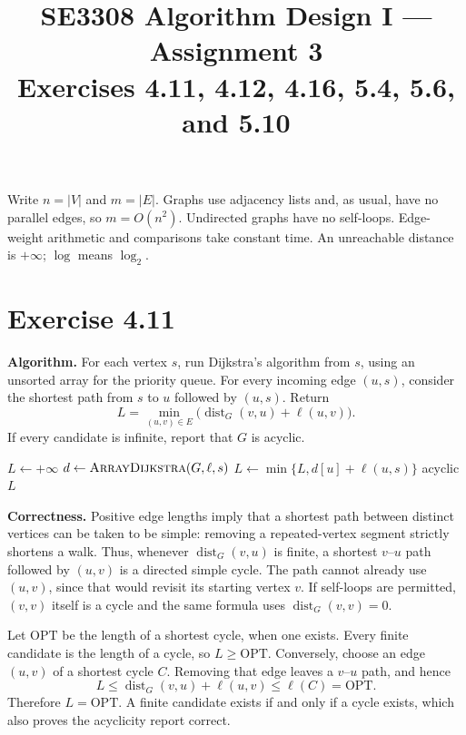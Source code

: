 \documentclass[11pt]{article}
\title{SE3308 Algorithm Design I --- Assignment 3\\[0.3em]
\large Exercises 4.11, 4.12, 4.16, 5.4, 5.6, and 5.10}
\author{\studentname\quad\studentid}
\date{}
\newcommand{\dist}{\operatorname{dist}}
\newcommand{\exercise}[1]{\Needspace{6\baselineskip}\section*{Exercise #1}}
\begin{document}
\maketitle

Write $n=|V|$ and $m=|E|$. Graphs use adjacency lists and, as usual, have no
parallel edges, so $m=O(n^2)$. Undirected graphs have no self-loops.
Edge-weight arithmetic and comparisons take constant time. An unreachable
distance is $+\infty$; $\log$ means $\log_2$.

\exercise{4.11}

\textbf{Algorithm.} For each vertex $s$, run Dijkstra's algorithm from $s$,
using an unsorted array for the priority queue. For every incoming edge
$(u,s)$, consider the shortest path from $s$ to $u$ followed by $(u,s)$.
Return
\[
  \boxed{L=\min_{(u,v)\in E}\bigl(\dist_G(v,u)+\ell(u,v)\bigr).}
\]
If every candidate is infinite, report that $G$ is acyclic.

\begin{algorithm}[H]
\caption{Shortest directed cycle}
\begin{algorithmic}[1]
  \State $L\gets+\infty$
    \State $d\gets\Call{ArrayDijkstra}{G,\ell,s}$
      \State $L\gets\min\{L,d[u]+\ell(u,s)\}$
    \EndFor
  \EndFor
   \State \Return \textnormal{acyclic} \EndIf
  \State \Return $L$
\EndFunction
\end{algorithmic}
\end{algorithm}

\textbf{Correctness.} Positive edge lengths imply that a shortest path between
distinct vertices can be taken to be simple: removing a repeated-vertex
segment strictly shortens a walk. Thus, whenever $\dist_G(v,u)$ is finite,
a shortest $v$--$u$ path followed by $(u,v)$ is a directed simple cycle.
The path cannot already use $(u,v)$, since that would revisit its starting
vertex $v$. If self-loops are permitted, $(v,v)$ itself is a cycle and the
same formula uses $\dist_G(v,v)=0$.

Let $\mathrm{OPT}$ be the length of a shortest cycle, when one exists.
Every finite candidate is the length of a cycle, so $L\ge\mathrm{OPT}$.
Conversely, choose an edge $(u,v)$ of a shortest cycle $C$. Removing that
edge leaves a $v$--$u$ path, and hence
\[
  L\le \dist_G(v,u)+\ell(u,v)\le \ell(C)=\mathrm{OPT}.
\]
Therefore $L=\mathrm{OPT}$. A finite candidate exists if and only if a cycle
exists, which also proves the acyclicity report correct.
\end{document}
